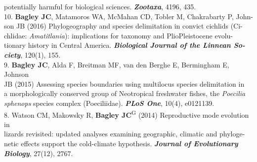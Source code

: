 \documentclass[margin,line]{res}
\begin{document}
\begin{resume}
\hspace*{8mm}potentially harmful for biological sciences. {\it \textbf{Zootaxa}}, 4196, 435. \\
10. \textbf{Bagley JC}, Matamoros WA, McMahan CD, Tobler M, Chakrabarty P, John-\\
\hspace*{8mm} son JB (2016) Phylogeography and species delimitation in convict cichlids (Ci-\\
\hspace*{8mm} chlidae: \emph{Amatitlania}): implications for taxonomy and Plio\textemdash Pleistocene evolu-\\
\hspace*{8mm} tionary history in Central America. {\it \textbf{Biological Journal of the Linnean So-}\\ \vspace{2mm}
\hspace*{8mm}\textbf{ciety}}, 120(1), 155. \\
9. \textbf{Bagley JC}, Alda F, Breitman MF, van den Berghe E, Bermingham E, Johnson\\
\hspace*{8mm} JB (2015) Assessing species boundaries using multilocus species delimitation in \\
\hspace*{8mm} a morphologically conserved group of Neotropical freshwater fishes, the \emph{Poecilia}\\ \vspace{2mm}
\hspace*{8mm} \emph{sphenops} species complex (Poeciliidae). {\it \textbf{PLoS One}}, 10(4), e0121139. \\
8. Watson CM, Makowsky R, \textbf{Bagley JC}\textsuperscript{G} (2014) Reproductive mode evolution in\\ 
\hspace*{8mm} lizards revisited: updated analyses examining geographic, climatic and phyloge-\\
\hspace*{8mm} netic effects support the cold-climate hypothesis. {\it \textbf{Journal of Evolutionary}\\ \vspace{2mm}
\hspace*{8mm}\textbf{Biology}}, 27(12), 2767. \\

\end{resume}
\end{document}
